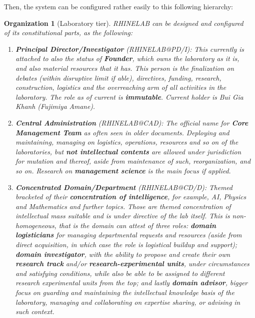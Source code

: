 \documentclass[10pt,a4paper]{article}
\newtheorem{org}{Organization}[section]
\begin{document}
Then, the system can be configured rather easily to this following hierarchy: 
\begin{org}[Laboratory tier]
    RHINELAB can be designed and configured of its constitutional parts, as the following: 
    \begin{enumerate}[topsep=1pt,itemsep=1pt]
        \item \textbf{Principal Director/Investigator} (\textsf{RHINELAB@PD/I}): This currently is attached to also the status of \textbf{Founder}, which owns the laboratory as it is, and also material resources that it has. This person is the finalization on debates (within disruptive limit if able), directives, funding, research, construction, logistics and the overreaching arm of all activities in the laboratory. The role as of current is \textbf{immutable}. Current holder is \textit{Bui Gia Khanh} (Fujimiya Amane). 
        \item \textbf{Central Administration} (\textsf{RHINELAB@CAD}): The official name for \textbf{Core Management Team} as often seen in older documents. Deploying and maintaining, managing on logistics, operations, resources and so on of the laboratories, but \textbf{not intellectual contents} are allowed under jurisdiction for mutation and thereof, aside from maintenance of such, reorganization, and so on. Research on \textbf{management science} is the main focus if applied. 
        \item \textbf{Concentrated Domain/Department} (\textsf{RHINELAB@CD/D}): Themed bracketed of their \textbf{concentration of intelligence}, for example, AI, Physics and Mathematics and further topics. Those are themed concentration of intellectual mass suitable and is under directive of the lab itself. This is \textit{non-homogeneous}, that is the domain can attest of three roles: \textbf{domain logisticians} for managing departmental requests and resources (aside from direct acquisition, in which case the role is logistical buildup and support); \textbf{domain investigator}, with the ability to propose and create their own \textbf{research track} and/or \textbf{research-experimental units}, under circumstances and satisfying conditions, while also be able to be assigned to different research experimental units from the top; and lastly \textbf{domain advisor}, bigger focus on guarding and maintaining the intellectual knowledge basis of the laboratory, managing and collaborating on expertise sharing, or advising in such context. 

\end{enumerate}
\end{org}
\end{document}
